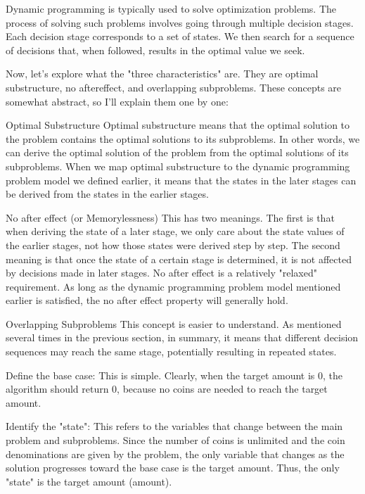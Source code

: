 \documentclass[a4paper,11pt,twoside]{book}
\begin{document}
	\par Dynamic programming is typically used to solve optimization problems. The process of solving such problems involves going through multiple decision stages. Each decision stage corresponds to a set of states. We then search for a sequence of decisions that, when followed, results in the optimal value we seek.
	
	\par Now, let's explore what the "three characteristics" are. They are optimal substructure, no aftereffect, and overlapping subproblems. These concepts are somewhat abstract, so I'll explain them one by one:
	
	\par Optimal Substructure
	Optimal substructure means that the optimal solution to the problem contains the optimal solutions to its subproblems. In other words, we can derive the optimal solution of the problem from the optimal solutions of its subproblems. When we map optimal substructure to the dynamic programming problem model we defined earlier, it means that the states in the later stages can be derived from the states in the earlier stages.
	
	\par No after effect (or Memorylessness)
	This has two meanings. The first is that when deriving the state of a later stage, we only care about the state values of the earlier stages, not how those states were derived step by step. The second meaning is that once the state of a certain stage is determined, it is not affected by decisions made in later stages. No after effect is a relatively "relaxed" requirement. As long as the dynamic programming problem model mentioned earlier is satisfied, the no after effect property will generally hold.
	
	\par Overlapping Subproblems
	This concept is easier to understand. As mentioned several times in the previous section, in summary, it means that different decision sequences may reach the same stage, potentially resulting in repeated states.
	
		
	\par Define the base case: This is simple. Clearly, when the target amount is 0, the algorithm should return 0, because no coins are needed to reach the target amount.
	
	\par Identify the "state": This refers to the variables that change between the main problem and subproblems. Since the number of coins is unlimited and the coin denominations are given by the problem, the only variable that changes as the solution progresses toward the base case is the target amount. Thus, the only "state" is the target amount (amount).
	
\end{document}
